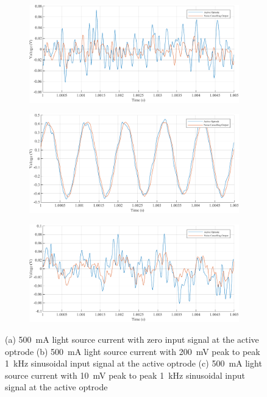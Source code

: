 \begin{figure}
\centering
\begin{subfigure}{1\textwidth}
  \centering
  \includegraphics[scale = 0.8]{5-Experiment/500mA Signal_a.pdf}
  \caption{}
  \label{fig_500mA Signal_a}
\end{subfigure}
\begin{subfigure}{1\textwidth}
  \centering
  \includegraphics[scale = 0.8 ]{5-Experiment/500mA Signal_b.pdf}
  \caption{}
  \label{fig_500mA Signal_b}
\end{subfigure}
\begin{subfigure}{1\textwidth}
  \centering
  \includegraphics[scale = 0.8 ]{5-Experiment/500mA Signal_c.pdf}
  \caption{}
  \label{fig_500mA Signal_c}
\end{subfigure}
\caption{(a) \qty{500}{\mA} light source current with zero input signal at the active optrode (b) \qty{500}{\mA} light source current with \qty{200}{\mV} peak to peak \qty{1}{\kHz} sinusoidal input signal at the active optrode (c) \qty{500}{\mA} light source current with \qty{10}{\mV} peak to peak \qty{1}{\kHz} sinusoidal input signal at the active optrode}
\label{fig_500mA Signal}
\end{figure}

